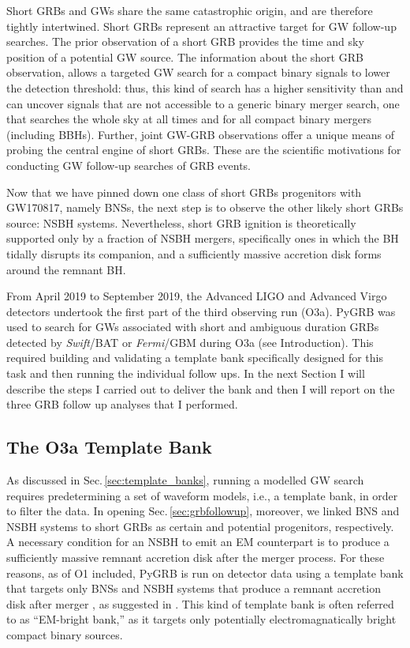 \documentclass[binding=0.6cm, LaM]{sapthesis}
\begin{document}
	Short GRBs and GWs 
	share the same catastrophic origin, 
	and are therefore tightly intertwined.
	Short GRBs represent an attractive target for GW follow-up searches. 
	The prior observation of a short GRB provides the time and sky position of a potential GW source. 
	The information about the short GRB observation, allows a targeted GW search for a compact binary signals to lower the detection threshold: thus,
        this kind of search has a higher sensitivity than
        and can uncover signals that are not accessible to
        a generic binary merger search, one that searches the whole sky at all times and for all compact binary mergers (including BBHs).
        Further, joint GW-GRB observations offer a unique means of probing the central engine of short GRBs.
        These are the scientific motivations for conducting GW follow-up searches of GRB events.

	Now that we have pinned down one class of short GRBs progenitors with GW170817, namely BNSs, 
	the next step is to observe the other likely short GRBs source: NSBH systems.
	Nevertheless, short GRB ignition is theoretically supported only by a fraction of NSBH mergers,
	specifically ones in which the BH tidally disrupts its companion, 
	and a sufficiently massive accretion disk forms around the remnant BH.

	From April 2019 to September 2019, the Advanced LIGO  and  Advanced  Virgo detectors undertook 
	the first part of the third observing run (O3a).
	{\rm PyGRB} was used to search for GWs associated with short and ambiguous duration GRBs detected by {\it Swift}/BAT or {\it Fermi}/GBM during O3a (see Introduction).
	This required building and validating a template bank specifically designed for this task and then running the individual follow ups.  In the next Section I will describe the steps I carried out to deliver the bank and then I will report on the three GRB follow up analyses that I performed.

\subsection{The O3a Template Bank}
\label{subsec:o3aTemplateBank}
	As discussed in Sec.\,\ref{sec:template_banks}, running a modelled GW search 
	requires predetermining a set of waveform models, i.e., a template bank, in order to filter the data. 
	In opening Sec.\,\ref{sec:grbfollowup}, moreover, we linked BNS and NSBH systems to short GRBs as certain and potential progenitors, respectively.
	A necessary condition for an NSBH to emit an EM counterpart
	is to produce a sufficiently massive remnant accretion disk after the merger process.
	For these reasons, as of O1 included, {\ttfamily PyGRB} is run on detector data using a template bank
	that targets only BNSs and NSBH systems that produce a remnant accretion disk after merger \cite{55,136,161}, as suggested in \cite{162}.  This kind of template bank is often referred to as ``EM-bright bank,'' as it targets only potentially electromagnatically bright compact binary sources.
\end{document}
